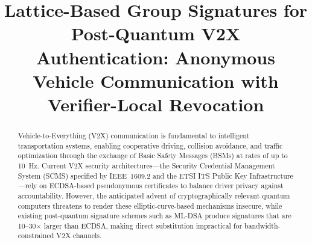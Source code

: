 \documentclass[conference,10pt]{IEEEtran}
\begin{document}
\title{Lattice-Based Group Signatures for Post-Quantum V2X Authentication: Anonymous Vehicle Communication with Verifier-Local Revocation}

\author{
}

\maketitle

\begin{abstract}
Vehicle-to-Everything (V2X) communication is fundamental to intelligent transportation systems, enabling cooperative driving, collision avoidance, and traffic optimization through the exchange of Basic Safety Messages (BSMs) at rates of up to 10~Hz. Current V2X security architectures---the Security Credential Management System (SCMS) specified by IEEE~1609.2 and the ETSI ITS Public Key Infrastructure---rely on ECDSA-based pseudonymous certificates to balance driver privacy against accountability. However, the anticipated advent of cryptographically relevant quantum computers threatens to render these elliptic-curve-based mechanisms insecure, while existing post-quantum signature schemes such as ML-DSA produce signatures that are 10--30$\times$ larger than ECDSA, making direct substitution impractical for bandwidth-constrained V2X channels.


\end{abstract}
\end{document}
